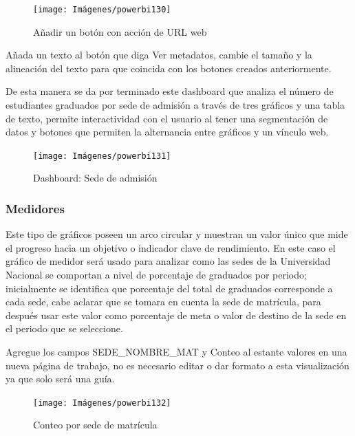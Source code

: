 \documentclass[
]{book}
\begin{document}
\begin{figure}

{\centering \texttt{[image: Imágenes/powerbi130]} 

}

\caption{Añadir un botón con acción de URL web}\label{fig:botonurlgraficobarradeherramientas-fig}
\end{figure}

Añada un texto al botón que diga Ver metadatos, cambie el tamaño y la alineación del texto para que coincida con los botones creados anteriormente.

De esta manera se da por terminado este dashboard que analiza el número de estudiantes graduados por sede de admisión a través de tres gráficos y una tabla de texto, permite interactividad con el usuario al tener una segmentación de datos y botones que permiten la alternancia entre gráficos y un vínculo web.

\begin{figure}

{\centering \texttt{[image: Imágenes/powerbi131]} 

}

\caption{Dashboard: Sede de admisión}\label{fig:tablerosededeadmision-fig}
\end{figure}

\hypertarget{medidores}{%
\subsubsection{Medidores}\label{medidores}}

Este tipo de gráficos poseen un arco circular y muestran un valor único que mide el progreso hacia un objetivo o indicador clave de rendimiento. En este caso el gráfico de medidor será usado para analizar como las sedes de la Universidad Nacional se comportan a nivel de porcentaje de graduados por periodo; inicialmente se identifica que porcentaje del total de graduados corresponde a cada sede, cabe aclarar que se tomara en cuenta la sede de matrícula, para después usar este valor como porcentaje de meta o valor de destino de la sede en el periodo que se seleccione.

Agregue los campos SEDE\_NOMBRE\_MAT y Conteo al estante valores en una nueva página de trabajo, no es necesario editar o dar formato a esta visualización ya que solo será una guía.

\begin{figure}

{\centering \texttt{[image: Imágenes/powerbi132]} 

}

\caption{Conteo por sede de matrícula}\label{fig:verconteiporsedematricula-fig}
\end{figure}
\end{document}

